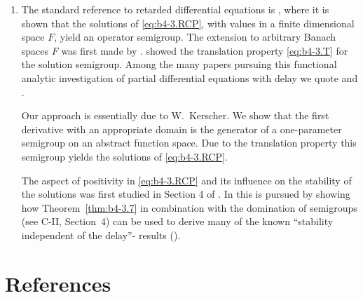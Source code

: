 \begin{enumerate}[label=\emph{Section \arabic*:}, wide, itemsep=1ex]
\item The standard reference to retarded differential equations is \citet{hale:1977}, where it is shown that the solutions of \eqref{eq:b4-3.RCP}, with values in a finite dimensional space $F$, yield an operator semigroup. 
The extension to arbitrary Banach spaces $F$ was first made by \citet{traviswebb:1974}. 
\citet{plant:1977} showed the translation property \eqref{eq:b4-3.T} for the solution semigroup. 
Among the many papers pursuing this functional analytic investigation of partial differential equations with delay we quote \citet{diblasioetal:1984} and \citet{kunischschappacher:1983}.

Our approach is essentially due to W.~Kerscher. 
We show that the first derivative with an appropriate domain is the generator of a one-parameter semigroup on an abstract function space. 
Due to the translation property this semigroup yields the solutions of \eqref{eq:b4-3.RCP}.

The aspect of positivity in \eqref{eq:b4-3.RCP} and its influence on the stability of the solutions was first studied in Section 4 of \citet{kerschernagel:1984}. 
In \citet{kerscher:1986} this is pursued by showing how Theorem~\ref{thm:b4-3.7} in combination with the domination of semigroups (see C-II, Section~4) can be used to derive many of the known \enquote{stability independent of the delay}- results (\eg  \citet{cookeferreira:1983}).
\end{enumerate}


\section*{References}
{\RaggedRight
\renewcommand{\bibsection}{}

}

